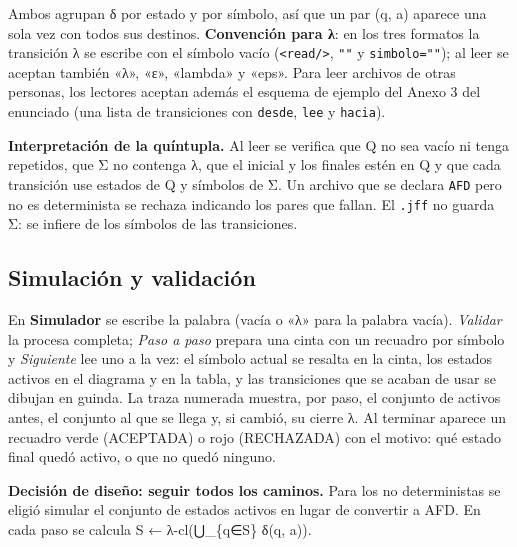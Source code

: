 Ambos agrupan δ por estado y por símbolo, así que un par (q, a) aparece una sola vez con todos sus destinos. \textbf{Convención para λ}: en los tres formatos la transición λ se escribe con el símbolo vacío (\texttt{\textless{}read/\textgreater{}}, \texttt{""} y \texttt{simbolo=""}); al leer se aceptan también «λ», «ε», «lambda» y «eps». Para leer archivos de otras personas, los lectores aceptan además el esquema de ejemplo del Anexo 3 del enunciado (una lista de transiciones con \texttt{desde}, \texttt{lee} y \texttt{hacia}).

\textbf{Interpretación de la quíntupla.} Al leer se verifica que Q no sea vacío ni tenga repetidos, que Σ no contenga λ, que el inicial y los finales estén en Q y que cada transición use estados de Q y símbolos de Σ. Un archivo que se declara \texttt{AFD} pero no es determinista se rechaza indicando los pares que fallan. El \texttt{.jff} no guarda Σ: se infiere de los símbolos de las transiciones.

\hypertarget{simulaciuxf3n-y-validaciuxf3n}{%
\subsection{Simulación y validación}\label{simulaciuxf3n-y-validaciuxf3n}}

En \textbf{Simulador} se escribe la palabra (vacía o «λ» para la palabra vacía). \emph{Validar} la procesa completa; \emph{Paso a paso} prepara una cinta con un recuadro por símbolo y \emph{Siguiente} lee uno a la vez: el símbolo actual se resalta en la cinta, los estados activos en el diagrama y en la tabla, y las transiciones que se acaban de usar se dibujan en guinda. La traza numerada muestra, por paso, el conjunto de activos antes, el conjunto al que se llega y, si cambió, su cierre λ. Al terminar aparece un recuadro verde (ACEPTADA) o rojo (RECHAZADA) con el motivo: qué estado final quedó activo, o que no quedó ninguno.

\textbf{Decisión de diseño: seguir todos los caminos.} Para los no deterministas se eligió simular el conjunto de estados activos en lugar de convertir a AFD. En cada paso se calcula S ← λ-cl(⋃\_\{q∈S\} δ(q, a)).

